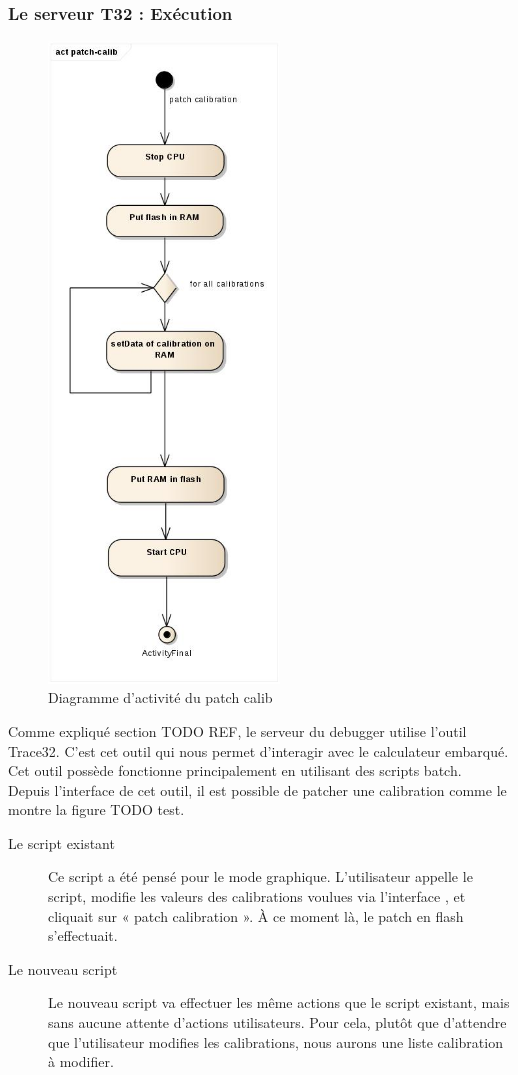 	\subsubsection{Le serveur T32 : Exécution}
		\begin{figure}
			\vspace{-30px}
			\includegraphics[height=17cm]{contents/images/script_activite.jpg}
			\caption{Diagramme d'activité du patch calib}
			\label{fig:scriptBatch} 
						\vspace{-7cm}
		\end{figure}
	Comme expliqué section TODO REF, le serveur du debugger utilise l'outil Trace32. C'est cet outil qui nous permet d’interagir avec le calculateur embarqué. Cet outil possède fonctionne principalement en utilisant des scripts batch.\\
	Depuis l'interface de cet outil, il est possible de patcher une calibration comme le montre la figure TODO test.

	\begin{description}
		\item[Le script existant] Ce script a été pensé pour le mode graphique. L'utilisateur appelle le script, modifie les valeurs des calibrations voulues via l'interface , et cliquait sur « patch calibration ». À ce moment là, le patch en flash s'effectuait.
		\item[Le nouveau script] Le nouveau script va effectuer les même actions que le script existant, mais sans aucune attente d'actions utilisateurs. Pour cela, plutôt que d'attendre que l'utilisateur modifies les calibrations, nous aurons une liste calibration à modifier.
	\end{description}

